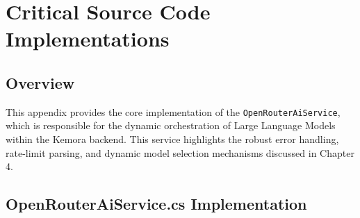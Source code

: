 \chapter{Critical Source Code Implementations}

\section{Overview}
This appendix provides the core implementation of the \texttt{OpenRouterAiService}, which is responsible for the dynamic orchestration of Large Language Models within the Kemora backend. This service highlights the robust error handling, rate-limit parsing, and dynamic model selection mechanisms discussed in Chapter 4.

\section{OpenRouterAiService.cs Implementation}

